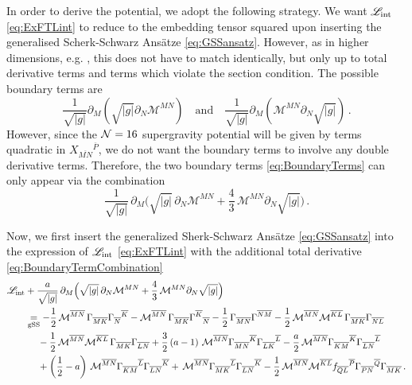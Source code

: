 \documentclass[a4paper, 11pt]{article}
\numberwithin{equation}{section}
\newcommand{\ov}[1]{\overline{#1}}
\newcommand{\+}{\oplus}
\newcommand{\gM}{\mathcal{M}}
\newcommand{\fl}[1]{\ov{#1}}
\newcommand{\dg}{\vert g \vert}
\newcommand{\M}{\ensuremath{\mathcal{M}}\xspace}
\begin{document}
In order to derive the potential, we adopt the following strategy. We want $\mathscr{L}_{\rm int}$ \eqref{eq:ExFTLint} to reduce to the embedding tensor squared upon inserting the generalised Scherk-Schwarz Ans\"{a}tze \eqref{eq:GSSansatz}. However, as in higher dimensions, e.g. \cite{Berman:2012uy,Musaev:2013rq,Blair:2014zba}, this does not have to match identically, but only up to total derivative terms and terms which violate the section condition. The possible boundary terms are
\begin{equation} \label{eq:BoundaryTerms}
	\frac{1}{\sqrt{\dg}} \partial_M \left(\sqrt{\dg} \partial_N \gM^{MN} \right) \quad \text{and} \quad \frac{1}{\sqrt{\dg}} \partial_M \left( \gM^{MN} \partial_N \sqrt{\dg}\right) \,.
\end{equation}
However, since the ${\cal N}=16$ supergravity potential will be given by terms quadratic in $X_{\fl{MN}}{}^{\fl{P}}$, we do not want the boundary terms to involve any double derivative terms. Therefore, the two boundary terms \eqref{eq:BoundaryTerms} can only appear via the combination
\begin{equation} \label{eq:BoundaryTermCombination}
	\frac{1}{\sqrt{\dg}}\,\partial_{M}\Big(\sqrt{\dg}\,\partial_{N}\M^{MN}+\frac{4}{3}\,\M^{MN}\partial_{N}\sqrt{\dg}\Big) \,.
\end{equation}

Now, we first insert the generalized Sherk-Schwarz Ansätze \eqref{eq:GSSansatz} into the expression of $\mathscr{L}_{\rm int}$ \eqref{eq:ExFTLint} with the additional total derivative \eqref{eq:BoundaryTermCombination}
\begin{equation} \label{eq:Lintexpansion}
	\begin{aligned}
		\mathscr{L}_{\rm int} &+ \frac{a}{\sqrt{\vert g\vert}}\,\partial_{M}\Big(\sqrt{\vert g\vert}\,\partial_{N}\M^{MN}+\frac{4}{3}\,\M^{MN}\partial_{N}\sqrt{\vert g\vert}\Big)\\
		&\underset{\rm gSS}{=} -\frac{1}{2}\,\M^{\fl{MN}}\,\Gamma_{\fl{MK}}\Gamma_{\fl{N}}{}^{\fl{K}} -\M^{\fl{MN}}\,\Gamma_{\fl{MK}}\Gamma^{\fl{K}}{}_{\fl{N}} -\frac{1}{2}\,\Gamma_{\fl{MN}}\Gamma^{\fl{NM}} - \frac{1}{2}\,\M^{\fl{MN}}\M^{\fl{KL}}\,\Gamma_{\fl{MK}}\Gamma_{\fl{NL}} \\
		&\ \quad - \frac{1}{2}\,\M^{\fl{MN}}\M^{\fl{KL}}\,\Gamma_{\fl{MK}}\Gamma_{\fl{LN}} +\frac{3}{2}\left(a-1\right)\,\M^{\fl{MN}}\Gamma_{\fl{MN}}{}^{\fl{K}}\Gamma_{\fl{LK}}{}^{\fl{L}}-\frac{a}{2}\,\M^{\fl{MN}}\Gamma_{\fl{KM}}{}^{\fl{K}}\Gamma_{\fl{LN}}{}^{\fl{L}}\\
		&\ \quad + \left(\frac{1}{2}-a\right)\,\M^{\fl{MN}}\Gamma_{\fl{KM}}{}^{\fl{L}}\Gamma_{\fl{LN}}{}^{\fl{K}}+\,\M^{\fl{MN}}\Gamma_{\fl{MK}}{}^{\fl{L}}\Gamma_{\fl{LN}}{}^{\fl{K}}-\frac{1}{2}\,\M^{\fl{MN}}\M^{\fl{KL}}f_{\fl{QL}}{}^{\fl{P}}\Gamma_{\fl{PN}}{}^{\fl{Q}}\Gamma_{\fl{MK}}\,.
	\end{aligned}
\end{equation}
\end{document}
